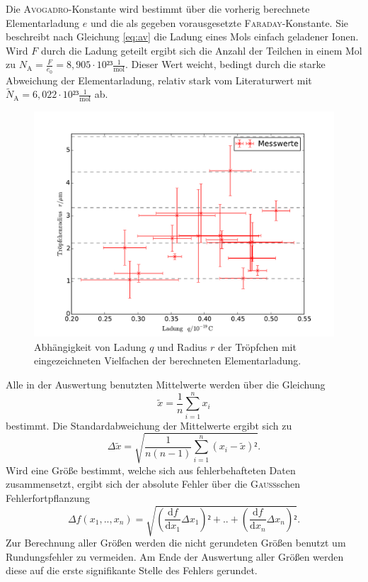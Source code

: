 Die \textsc{Avogadro}-Konstante wird bestimmt über die vorherig berechnete Elementarladung $e$ und die als gegeben vorausgesetzte \textsc{Faraday}-Konstante. Sie beschreibt nach Gleichung \eqref{eq:av} die Ladung eines Mols einfach geladener Ionen. Wird $F$ durch die Ladung geteilt ergibt sich die Anzahl der Teilchen in einem Mol zu $N_\mathup{A}=\frac{F}{e_0}=8,905\cdot10²³\frac{1}{\si\mol}$. Dieser Wert weicht, bedingt durch die starke Abweichung der Elementarladung, relativ stark vom Literaturwert mit $\tilde{N}_\mathup{A}=6,022\cdot10²³\frac{1}{\si\mol}$ ab.
\begin{figure}
	\centering
	\includegraphics[width=\textwidth]{Bilder/plot_messwerte+.pdf}
	\caption{Abhängigkeit von Ladung $q$ und Radius $r$ der Tröpfchen mit eingezeichneten Vielfachen der berechneten Elementarladung.}
	\label{fig:label1}
\end{figure}

Alle in der Auswertung benutzten Mittelwerte werden über die Gleichung
\begin{equation}
\tilde{x}=\frac{1}{n}\sum_{i=1}^n {x_i}
\end{equation}
bestimmt. Die Standardabweichung der Mittelwerte ergibt sich zu 
\begin{equation}
\Delta{\tilde{x}}=\sqrt{\frac{1}{n(n-1)}\sum_{i=1}^n {(x_i-\tilde{x})²}}.
\end{equation}
Wird eine Größe bestimmt, welche sich aus fehlerbehafteten Daten zusammensetzt, ergibt sich der absolute Fehler über die \textsc{Gauss}schen Fehlerfortpflanzung 
\begin{equation}
\Delta{f}(x_1,..,x_n)=\sqrt{\left(\frac{\mathup{d}f}{\mathup{d}x_1}\Delta{x_1}\right)²+..+\left(\frac{\mathup{d}f}{\mathup{d}x_n}\Delta{x_n}\right)²}.
\end{equation}
Zur Berechnung aller Größen werden die nicht gerundeten Größen benutzt um Rundungsfehler zu vermeiden. Am Ende der Auswertung aller Größen werden diese auf die erste signifikante Stelle des Fehlers gerundet. 
